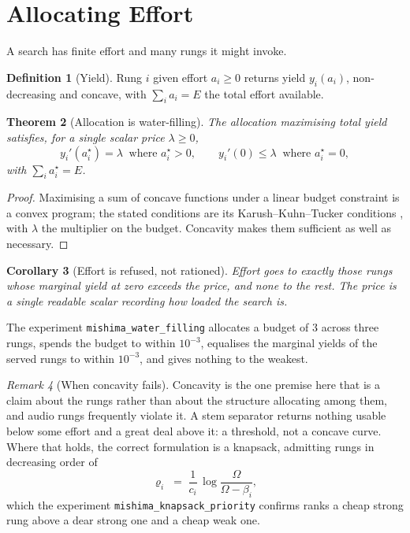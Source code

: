\documentclass[11pt,twocolumn,a4paper]{article}
\newtheorem{theorem}{Theorem}[section]
\newtheorem{corollary}[theorem]{Corollary}
\theoremstyle{definition}
\newtheorem{definition}[theorem]{Definition}
\theoremstyle{remark}
\newtheorem{remark}[theorem]{Remark}
\newcommand{\flo}{\beta}
\newcommand{\Om}{\Omega}
\begin{document}
\section{Allocating Effort}
\label{sec:allocation}

A search has finite effort and many rungs it might invoke.

\begin{definition}[Yield]
\label{def:yield}
Rung $i$ given effort $a_i\ge0$ returns yield $y_i(a_i)$, non-decreasing and
concave, with $\sum_i a_i = E$ the total effort available.
\end{definition}

\begin{theorem}[Allocation is water-filling]
\label{thm:waterfill}
The allocation maximising total yield satisfies, for a single scalar price
$\lambda\ge0$,
\[
  y_i'(a_i^{\star}) = \lambda \ \text{ where } a_i^{\star}>0,
  \qquad
  y_i'(0) \le \lambda \ \text{ where } a_i^{\star}=0,
\]
with $\sum_i a_i^{\star}=E$.
\end{theorem}

\begin{proof}
Maximising a sum of concave functions under a linear budget constraint is a
convex program; the stated conditions are its Karush--Kuhn--Tucker conditions
\citep{boyd2004convex}, with $\lambda$ the multiplier on the budget. Concavity
makes them sufficient as well as necessary.
\end{proof}

\begin{corollary}[Effort is refused, not rationed]
\label{cor:engaged}
Effort goes to exactly those rungs whose marginal yield at zero exceeds the
price, and none to the rest. The price is a single readable scalar recording how
loaded the search is.
\end{corollary}

The experiment \texttt{mishima\_water\_filling} allocates a budget of $3$ across
three rungs, spends the budget to within $10^{-3}$, equalises the marginal yields
of the served rungs to within $10^{-3}$, and gives nothing to the weakest.

\begin{remark}[When concavity fails]
\label{rem:knapsack}
Concavity is the one premise here that is a claim about the rungs rather than
about the structure allocating among them, and audio rungs frequently violate it.
A stem separator returns nothing usable below some effort and a great deal above
it: a threshold, not a concave curve. Where that holds, the correct formulation
is a knapsack, admitting rungs in decreasing order of
\[
  \varrho_i \;=\; \frac{1}{c_i}\,\log\frac{\Om}{\Om-\flo_i},
\]
which the experiment \texttt{mishima\_knapsack\_priority} confirms ranks a cheap
strong rung above a dear strong one and a cheap weak one.
\end{remark}
\end{document}
